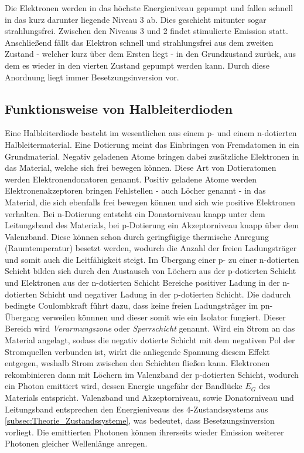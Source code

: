 Die Elektronen werden in das höchste Energieniveau \dq gepumpt\dq{} und fallen schnell in das kurz darunter liegende Niveau 3 ab. Dies geschieht mitunter sogar strahlungsfrei.
Zwischen den Niveaus 3 und 2 findet stimulierte Emission statt. Anschließend fällt das Elektron schnell und strahlungsfrei aus dem zweiten Zustand - welcher kurz über dem Ersten
liegt - in den Grundzustand zurück, aus dem es wieder in den vierten Zustand gepumpt werden kann. Durch diese Anordnung liegt immer Besetzungsinversion vor.

\subsection{Funktionsweise von Halbleiterdioden}
Eine Halbleiterdiode besteht im wesentlichen aus einem p- und einem n-dotierten Halbleitermaterial. Eine \glqq Dotierung\grqq{} meint das Einbringen von Fremdatomen in ein
Grundmaterial. Negativ geladenen Atome bringen dabei zusätzliche Elektronen in das Material, welche sich frei bewegen können. Diese Art von Dotieratomen werden Elektronendonatoren
genannt. Positiv geladene Atome werden Elektronenakzeptoren bringen \dq Fehlstellen\dq{} - auch Löcher genannt - in das Material, die sich ebenfalls frei bewegen können 
und sich wie positive Elektronen verhalten. Bei n-Dotierung entsteht ein Donatorniveau knapp unter dem Leitungsband des Materials, bei p-Dotierung ein Akzeptorniveau knapp 
über dem Valenzband. Diese können schon durch geringfügige thermische Anregung (Raumtemperatur) besetzt werden, wodurch die Anzahl der freien Ladungsträger und somit auch die 
Leitfähigkeit steigt. 
Im Übergang einer p- zu einer n-dotierten Schicht bilden sich durch den Austausch von Löchern aus der p-dotierten Schicht und Elektronen aus der n-dotierten Schicht Bereiche 
positiver Ladung in der n-dotierten Schicht und negativer Ladung in der p-dotierten Schicht. Die dadurch bedingte Coulombkraft führt dazu, dass keine freien Ladungsträger 
im pn-Übergang verweilen könnnen und dieser somit wie ein Isolator fungiert. Dieser Bereich wird \textit{Verarmungszone} oder \textit{Sperrschicht} genannt.
Wird ein Strom an das Material angelagt, sodass die negativ dotierte Schicht mit dem negativen Pol der Stromquellen verbunden ist, wirkt die anliegende Spannung diesem 
Effekt entgegen, weshalb Strom zwischen den Schichten fließen kann. Elektronen rekombinieren dann mit Löchern im Valenzband der p-dotierten Schicht, wodurch ein Photon
emittiert wird, dessen Energie ungefähr der Bandlücke $E_G$ des Materials entspricht. Valenzband und Akzeptorniveau, sowie Donatorniveau und Leitungsband entsprechen 
den Energieniveaus des 4-Zustandssystems aus \autoref{subsec:Theorie_Zustandssysteme}, was bedeutet, dass Besetzungsinversion vorliegt. 
Die emittierten Photonen können ihrerseits wieder Emission weiterer Photonen gleicher Wellenlänge anregen.

